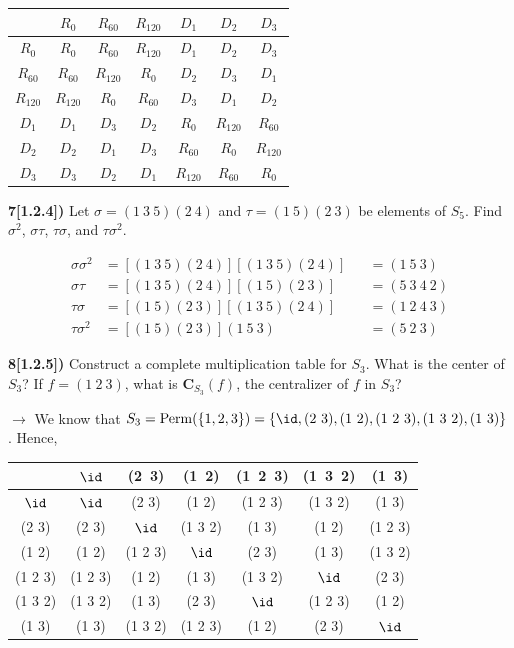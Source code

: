 \documentclass[12pt,a4paper]{article}
\newcommand{\prob}[2]{\textbf{#1)} #2}
\begin{document}
\begin{table}[H]
 \begin{center}
  \begin{tabular}{c|cccccc}
   & $R_{0}$ & $R_{60}$ & $R_{120}$ & $D_1$ & $D_2$ & $D_3$ \\
  \hline
  $R_{0}$ & $R_{0}$ & $R_{60}$ & $R_{120}$ & $D_1$ & $D_2$ & $D_3$ \\
  $R_{60}$ & $R_{60}$ & $R_{120}$ & $R_{0}$ & $D_2$ & $D_3$ & $D_1$ \\
  $R_{120}$ & $R_{120}$ & $R_{0}$ & $R_{60}$ & $D_3$ & $D_1$ & $D_2$ \\
  $D_1$ & $D_1$ & $D_3$ & $D_2$ & $R_{0}$ & $R_{120}$ & $R_{60}$ \\
  $D_2$ & $D_2$ & $D_1$ & $D_3$ & $R_{60}$ & $R_{0}$ & $R_{120}$ \\
  $D_3$ & $D_3$ & $D_2$ & $D_1$ & $R_{120}$ & $R_{60}$ & $R_{0}$ \\
  \end{tabular}
 \end{center}
\end{table}

\prob{7[1.2.4]}{Let $\sigma = (1~3~5)(2~4)$ and $\tau = (1~5)(2~3)$ be elements of $S_5$. Find $\sigma^2$, $\sigma\tau$, $\tau\sigma$, and $\tau\sigma^2$.}

\begin{alignat*}
\sigma \sigma^2 &= [(1~3~5)(2~4)][(1~3~5)(2~4)] &&= (1~5~3) \\
\sigma\tau &= [(1~3~5)(2~4)][(1~5)(2~3)] &&= (5~3~4~2) \\
\tau\sigma &= [(1~5)(2~3)][(1~3~5)(2~4)] &&= (1~2~4~3) \\
\tau\sigma^2 &= [(1~5)(2~3)](1~5~3) &&= (5~2~3)
\end{alignat*}

\prob{8[1.2.5]}{Construct a complete multiplication table for $S_3$. What is the center of $S_3$? If $f = (1~2~3)$, what is $\mathbf{C}_{S_3}(f)$, the centralizer of $f$ in $S_3$?}

$\rightarrow$ We know that $S_3 = {\rm Perm}(\{1,2,3\}) = \{\id,(2~3),(1~2),(1~2~3),(1~3~2),(1~3)\}$. Hence,
\begin{table}[H]
 \begin{center}
  \begin{tabular}{c|cccccc}
   & $\id$ & (2~3) & (1~2) & (1~2~3) & (1~3~2) & (1~3) \\
  \hline
  $\id$ & $\id$ & (2 3) & (1 2) & (1 2 3) & (1 3 2) & (1 3) \\
  (2 3) & (2 3) & $\id$ & (1 3 2) & (1 3) & (1 2) & (1 2 3) \\
  (1 2) & (1 2) & (1 2 3) & $\id$ & (2 3) & (1 3) & (1 3 2) \\
  (1 2 3) & (1 2 3) & (1 2) & (1 3) & (1 3 2) & $\id$ & (2 3) \\
  (1 3 2) & (1 3 2) & (1 3) & (2 3) & $\id$ & (1 2 3) & (1 2) \\
  (1 3) & (1 3) & (1 3 2) & (1 2 3) & (1 2) & (2 3) & $\id$ \\
  \end{tabular}
 \end{center}
\end{table}
\end{document}
